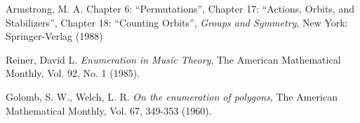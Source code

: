 \begin{thebibliography}{00}
%			
%			
%					
%			
			
%			
%			
%			
			{ Armstrong, M. A.} Chapter 6: ``Permutations'', Chapter 17: ``Actions, Orbits, and Stabilizers'', Chapter 18: ``Counting Orbits'',
			\textit{Groups and Symmetry},
			New York: Springer-Verlag
			(1988)
%			
%						
			
			{ Reiner, David L.}
			\textit{Enumeration in Music Theory},
			The American Mathematical Monthly, Vol. 92, No. 1
			(1985).

			{ Golomb, S. W., Welch, L. R.}
			\textit{On the enumeration of polygons},
			The American Mathematical Monthly, Vol. 67, 349-353
			(1960).
			

\end{thebibliography}
